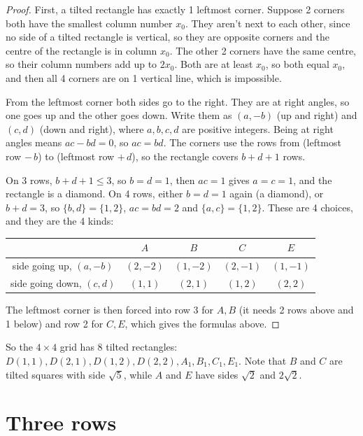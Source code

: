\documentclass[11pt]{article}
\theoremstyle{definition}
\theoremstyle{remark}
\begin{document}
\begin{proof}
First, a tilted rectangle has exactly 1 leftmost corner. Suppose 2 corners both have the
smallest column number $x_0$. They aren't next to each other, since no side of a tilted
rectangle is vertical, so they are opposite corners and the centre of the rectangle is in
column $x_0$. The other 2 corners have the same centre, so their column numbers add up to
$2x_0$. Both are at least $x_0$, so both equal $x_0$, and then all 4 corners are on 1 vertical
line, which is impossible.

From the leftmost corner both sides go to the right. They are at right angles, so one goes up
and the other goes down. Write them as $(a,-b)$ (up and right) and $(c,d)$ (down and right),
where $a,b,c,d$ are positive integers. Being at right angles means $ac-bd=0$, so $ac=bd$. The
corners use the rows from (leftmost row $-\,b$) to (leftmost row $+\,d$), so the rectangle
covers $b+d+1$ rows.

On 3 rows, $b+d+1\le3$, so $b=d=1$, then $ac=1$ gives $a=c=1$, and the rectangle is a diamond.
On 4 rows, either $b=d=1$ again (a diamond), or $b+d=3$, so $\{b,d\}=\{1,2\}$, $ac=bd=2$ and
$\{a,c\}=\{1,2\}$. These are 4 choices, and they are the 4 kinds:
\begin{center}
\begin{tabular}{ccccc}
\toprule
 & $A$ & $B$ & $C$ & $E$\\
\midrule
side going up, $(a,-b)$ & $(2,-2)$ & $(1,-2)$ & $(2,-1)$ & $(1,-1)$ \\
side going down, $(c,d)$ & $(1,1)$ & $(2,1)$ & $(1,2)$ & $(2,2)$ \\
\bottomrule
\end{tabular}
\end{center}
The leftmost corner is then forced into row 3 for $A,B$ (it needs 2 rows above and 1 below) and
row 2 for $C,E$, which gives the formulas above.
\end{proof}

So the $4\times4$ grid has 8 tilted rectangles: $D(1,1),D(2,1),D(1,2),D(2,2),A_1,B_1,C_1,E_1$.
Note that $B$ and $C$ are tilted squares with side $\sqrt5$, while $A$ and $E$ have sides
$\sqrt2$ and $2\sqrt2$.

\section{Three rows}\label{sec:three}
\end{document}
